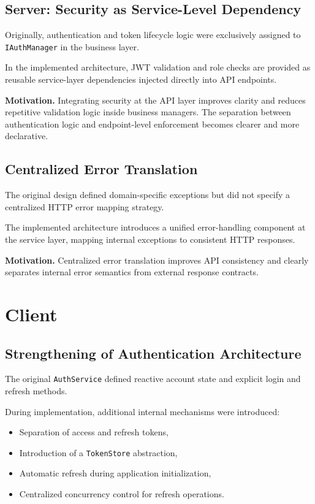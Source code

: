 \subsection{Server: Security as Service-Level Dependency}

Originally, authentication and token lifecycle logic were exclusively assigned to \texttt{IAuthManager} in the business layer.

In the implemented architecture, JWT validation and role checks are provided as reusable service-layer dependencies injected directly into API endpoints.

\textbf{Motivation.}  
Integrating security at the API layer improves clarity and reduces repetitive validation logic inside business managers. The separation between authentication logic and endpoint-level enforcement becomes clearer and more declarative.

\subsection{Centralized Error Translation}

The original design defined domain-specific exceptions but did not specify a centralized HTTP error mapping strategy.

The implemented architecture introduces a unified error-handling component at the service layer, mapping internal exceptions to consistent HTTP responses.

\textbf{Motivation.}  
Centralized error translation improves API consistency and clearly separates internal error semantics from external response contracts.

\section{Client}

\subsection{Strengthening of Authentication Architecture}

The original \texttt{AuthService} defined reactive account state and explicit login and refresh methods.

During implementation, additional internal mechanisms were introduced:
\begin{itemize}
    \item Separation of access and refresh tokens,
    \item Introduction of a \texttt{TokenStore} abstraction,
    \item Automatic refresh during application initialization,
    \item Centralized concurrency control for refresh operations.
\end{itemize}


